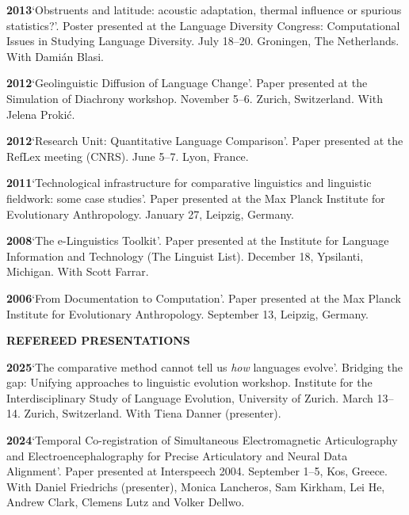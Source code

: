 \documentclass[11pt]{article}
\newcommand{\hangpara}{
 \setlength{\parindent}{0in} %
 \hangindent=0.42in %
}
\begin{document}
\vskip 6pt
\hangpara
{\bf 2013}\hspace{1ex}`Obstruents and latitude: acoustic adaptation, thermal influence or spurious statistics?'. Poster presented at the Language Diversity Congress: Computational Issues in Studying Language Diversity. July 18--20. Groningen, The Netherlands. With Dami{\'a}n Blasi.

\vskip 6pt
\hangpara
{\bf 2012}\hspace{1ex}`Geolinguistic Diffusion of Language Change'. Paper presented at the Simulation of Diachrony workshop. November 5--6. Zurich, Switzerland. With Jelena Proki{\'c}.

\vskip 6pt
\hangpara
{\bf 2012}\hspace{1ex}`Research Unit: Quantitative Language Comparison'. Paper presented at the RefLex meeting (CNRS). June 5--7. Lyon, France. 

\vskip 6pt
\hangpara
{\bf 2011}\hspace{1ex}`Technological infrastructure for comparative linguistics and linguistic fieldwork: some case studies'. Paper presented at the Max Planck Institute for Evolutionary Anthropology. January 27, Leipzig, Germany. 

\vskip 6pt
\hangpara
{\bf 2008}\hspace{1ex}`The e-Linguistics Toolkit'. Paper presented at the Institute for Language Information and Technology (The Linguist List). December 18, Ypsilanti, Michigan. With Scott Farrar.

\vskip 6pt
\hangpara
{\bf 2006}\hspace{1ex}`From Documentation to Computation'. Paper presented at the Max Planck Institute for Evolutionary Anthropology. September 13, Leipzig, Germany.


\vskip 20pt
\begin{flushleft}
{\bf REFEREED PRESENTATIONS}
\end{flushleft}

\hangpara
\vskip 6pt
{\bf 2025}\hspace{1ex}`The comparative method cannot tell us \textit{how} languages evolve'. Bridging the gap: Unifying approaches to linguistic evolution workshop. Institute for the Interdisciplinary Study of Language Evolution, University of Zurich. March 13--14. Zurich, Switzerland. With Tiena Danner (presenter).

\hangpara
\vskip 6pt
{\bf 2024}\hspace{1ex}`Temporal Co-registration of Simultaneous Electromagnetic Articulography and Electroencephalography for Precise Articulatory and Neural Data Alignment'. Paper presented at Interspeech 2004. September 1--5, Kos, Greece. With Daniel Friedrichs (presenter), Monica Lancheros, Sam Kirkham, Lei He, Andrew Clark, Clemens Lutz and Volker Dellwo.
\end{document}
